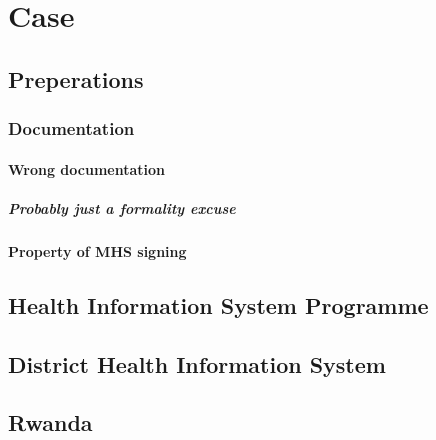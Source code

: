 \part{Case}
\chapter{Preperations}
\section{Documentation}
\subsection{Wrong documentation}
\subsubsection{Probably just a formality excuse}
\subsection{Property of MHS signing}
\chapter{Health Information System Programme}
\chapter{District Health Information System}
\chapter{Rwanda}